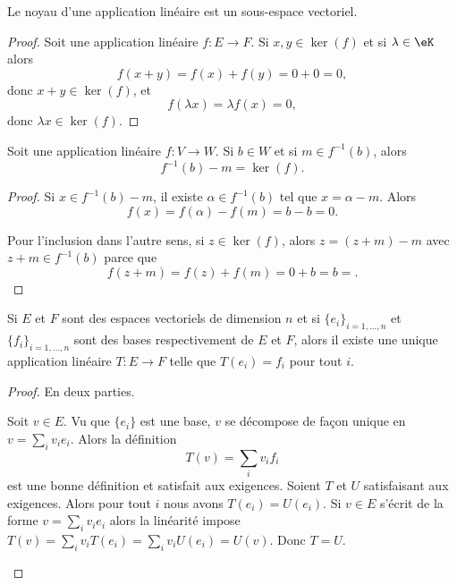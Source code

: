 \begin{proposition}     \label{PROPooRLLPooKYzsJp}
	Le noyau d'une application linéaire est un sous-espace vectoriel.
\end{proposition}

\begin{proof}
	Soit une application linéaire \( f\colon E\to F\). Si \( x,y\in \ker(f)\) et si \( \lambda\in \eK\) alors
	\begin{equation}
		f(x+y)=f(x)+f(y)=0+0=0,
	\end{equation}
	donc \( x+y\in \ker(f)\), et
	\begin{equation}
		f(\lambda x)=\lambda f(x)=0,
	\end{equation}
	donc \( \lambda x\in \ker(f)\).
\end{proof}

\begin{lemma}        \label{LEMooIQJMooJWRbub}
	Soit une application linéaire \( f\colon V\to W\). Si \( b\in W\) et si \( m\in f^{-1}(b)\), alors
	\begin{equation}
		f^{-1}(b)-m=\ker(f).
	\end{equation}
\end{lemma}

\begin{proof}
	Si \( x\in f^{-1}(b)-m\), il existe \( \alpha\in f^{-1}(b)\) tel que \( x=\alpha-m\). Alors
	\begin{equation}
		f(x)=f(\alpha)-f(m)=b-b=0.
	\end{equation}

	Pour l'inclusion dans l'autre sens, si \( z\in \ker(f)\), alors \( z=(z+m)-m\) avec \( z+m\in f^{-1}(b)\) parce que
	\begin{equation}
		f(z+m)=f(z)+f(m)=0+b=b=.
	\end{equation}
\end{proof}

\begin{proposition}
	Si \( E\) et \( F\) sont des espaces vectoriels de dimension \( n\) et si \( \{ e_i \}_{i=1,\ldots, n}\) et \( \{ f_i \}_{i=1,\ldots, n}\) sont des bases respectivement de \( E\) et \( F\), alors il existe une unique application linéaire \( T\colon E\to F\) telle que \( T(e_i)=f_i\) pour tout \( i\).
\end{proposition}

\begin{proof}
	En deux parties.\begin{subproof}
		\spitem[Existence]
		Soit \( v\in E\). Vu que \( \{ e_i \}\) est une base, \( v\) se décompose de façon unique en \( v=\sum_iv_ie_i\). Alors la définition
		\begin{equation}
			T(v)=\sum_iv_if_i
		\end{equation}
		est une bonne définition et satisfait aux exigences.
		\spitem[Unicité]
		Soient \( T\) et \( U\) satisfaisant aux exigences. Alors pour tout \( i\) nous avons \( T(e_i)=U(e_i)\). Si \( v\in E\) s'écrit de la forme \( v=\sum_iv_ie_i\) alors la linéarité impose \( T(v)=\sum_iv_iT(e_i)=\sum_iv_iU(e_i)=U(v)\). Donc \( T = U\).
	\end{subproof}
\end{proof}

